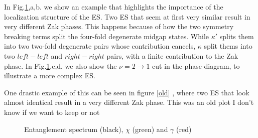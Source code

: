 \documentclass[twocolumn,amsmath,longbibliography,amssymb,superscriptaddress]{revtex4-1}
\newcommand{\carlos}[1]{{\color{red} #1}}
\begin{document}
In Fig.\ref{2},a,b. we show an example that highlights the importance of the localization structure of the ES. Two ES that seem at first very similar result in very different Zak phases. This happens because of how the two symmetry breaking terms split the four-fold degenerate midgap states. While $\kappa'$ splits them into two two-fold degenerate pairs whose contribution cancels, $\kappa$ split thems into two $left-left$ and $right-right$ pairs, with a finite contribution to the Zak phase. In Fig.\ref{2},c,d. we also show the $\nu = 2 \rightarrow 1$ cut in the phase-diagram, to illustrate a more complex ES. 

One drastic example of this can be seen in figure \ref{old} , where two ES that look almost identical result in a very different Zak phase. \carlos{This was an old plot I don't know if we want to keep or not}

\begin{figure}[h!]
\centering
{}\hspace{0mm}

\caption{Entanglement spectrum (black), $\chi$ (green) and $\gamma$ (red)  }
\label{2}
\end{figure}
\end{document}
